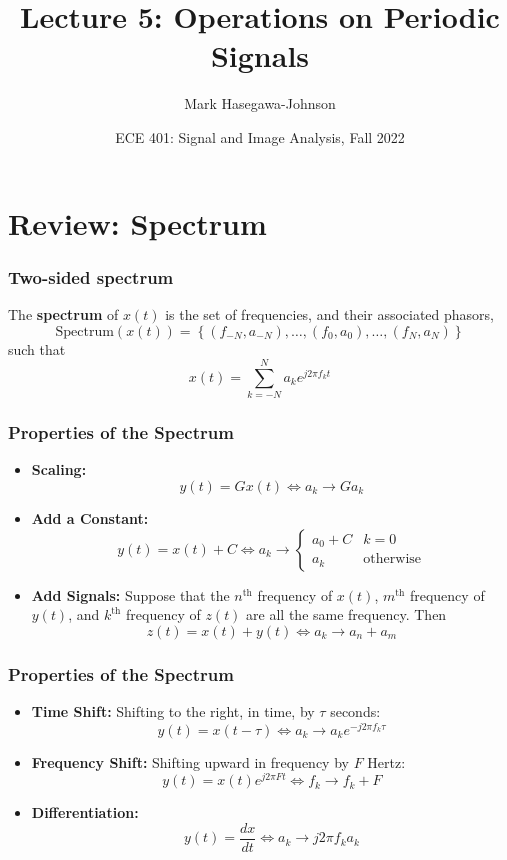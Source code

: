 \documentclass{beamer}
\title{Lecture 5: Operations on Periodic Signals}
\author{Mark Hasegawa-Johnson}
\date{ECE 401: Signal and Image Analysis, Fall 2022}
\begin{document}
\begin{frame}
  \maketitle
\end{frame}

\begin{frame}
  \tableofcontents
\end{frame}

\section[Spectrum]{Review: Spectrum}
\setcounter{subsection}{1}

\begin{frame}
  \frametitle{Two-sided spectrum}

  The {\bf spectrum} of $x(t)$ is the set of frequencies, and their
  associated phasors,
  \[
  \mbox{Spectrum}\left( x(t) \right) =
  \left\{ (f_{-N},a_{-N}), \ldots, (f_0,a_0), \ldots, (f_N,a_N) \right\}
  \]
  such that
  \[
  x(t) = \sum_{k=-N}^N a_ke^{j2\pi f_kt}
  \]
\end{frame}

\begin{frame}
  \frametitle{Properties of the Spectrum}
  \begin{itemize}
  \item {\bf Scaling:}
    \[
    y(t) = Gx(t)\Leftrightarrow a_k \rightarrow Ga_k
    \]
  \item {\bf Add a Constant:}
    \[
    y(t)=x(t)+C \Leftrightarrow
    a_k \rightarrow \begin{cases}
      a_0+C & k=0 \\
      a_k & \mbox{otherwise}
    \end{cases}
    \]
  \item {\bf Add Signals:} Suppose that the $n^{\textrm{th}}$ frequency
    of $x(t)$, $m^{\textrm{th}}$ frequency of $y(t)$, and
    $k^{\textrm{th}}$ frequency of $z(t)$ are all the same frequency.  Then 
    \[
    z(t)=x(t)+y(t)
    \Leftrightarrow
    a_k \rightarrow a_n+a_m
    \]
  \end{itemize}
\end{frame}

\begin{frame}
  \frametitle{Properties of the Spectrum}
  \begin{itemize}
  \item {\bf Time Shift:} Shifting to the right, in time, by $\tau$
    seconds:
    \[
    y(t)=x(t-\tau)\Leftrightarrow a_k\rightarrow a_k e^{-j2\pi f_k\tau}
    \]
  \item {\bf Frequency Shift:} Shifting upward in frequency by $F$
    Hertz:
    \[
    y(t)=x(t)e^{j2\pi Ft} \Leftrightarrow f_k\rightarrow f_k+F
    \]
  \item {\bf Differentiation:}
    \[
    y(t) = \frac{dx}{dt} \Leftrightarrow a_k\rightarrow j2\pi f_k a_k
    \]
  \end{itemize}
\end{frame}  
\end{document}
